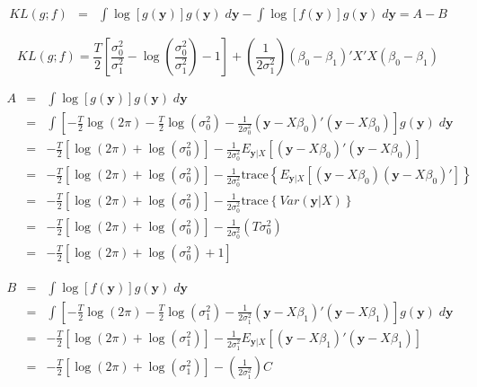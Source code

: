 \documentclass[12pt]{article}
\theoremstyle{definition}
\begin{document}
\begin{eqnarray*}
	KL(g;f)&=& \int \log[g(\mathbf{y})] g(\mathbf{y}) \; d \mathbf{y} - \int \log[f(\mathbf{y})]g(\mathbf{y}) \; d \mathbf{y} =  A - B 
\end{eqnarray*}

	$$KL(g;f) =  \frac{T}{2}\left[\frac{\sigma_0^2}{\sigma_1^2} - \log\left(\frac{\sigma_0^2}{\sigma_1^2}\right) - 1 \right] + \left(\frac{1}{2 \sigma_1^2}\right)\left(\beta_0 - \beta_1\right)'X'X\left(\beta_0 - \beta_1\right)$$

\begin{eqnarray*}
	A &=&\int \log[g(\mathbf{y})] g(\mathbf{y}) \; d \mathbf{y} \\
	&=& \int \left[-\frac{T}{2}\log(2\pi) -\frac{T}{2} \log(\sigma^2_0) - \frac{1}{2\sigma_0^2}\left(\textbf{y} - X\beta_0\right)'\left(\textbf{y} -X\beta_0\right) \right] g(\mathbf{y})\; d\mathbf{y}\\
	&=& -\frac{T}{2}\left[ \log(2\pi) + \log(\sigma^2_0)\right] -  \frac{1}{2\sigma_0^2} E_{\mathbf{y}|X}\left[\left(\textbf{y} - X\beta_0\right)'\left(\textbf{y} -X\beta_0\right)\right]\\
	&=& -\frac{T}{2}\left[ \log(2\pi) + \log(\sigma^2_0)\right] -  \frac{1}{2\sigma_0^2}\mbox{trace}\left\{ E_{\mathbf{y}|X}\left[\left(\textbf{y} - X\beta_0\right)\left(\textbf{y} -X\beta_0\right)'\right]\right\}\\
	&=& -\frac{T}{2}\left[ \log(2\pi) + \log(\sigma^2_0)\right] -  \frac{1}{2\sigma_0^2}\mbox{trace}\left\{ Var(\mathbf{y}|X)\right\}\\
	&=& -\frac{T}{2}\left[ \log(2\pi) + \log(\sigma^2_0)\right] -  \frac{1}{2\sigma_0^2}\left(T \sigma_0^2\right)\\
	&=& -\frac{T}{2}\left[ \log(2\pi) + \log(\sigma^2_0) +  1 \right]
\end{eqnarray*}


\begin{eqnarray*}
	B &=& \int \log[f(\mathbf{y})] g(\mathbf{y}) \; d \mathbf{y}\\
	&=& \int \left[ -\frac{T}{2}\log(2\pi) -\frac{T}{2} \log(\sigma^2_1) - \frac{1}{2\sigma_1^2}\left(\textbf{y} - X\beta_1\right)'\left(\textbf{y} -X\beta_1\right) \right] g(\mathbf{y})\;  d \mathbf{y}\\
		&=& -\frac{T}{2}\left[\log(2\pi) + \log(\sigma^2_1) \right]- \frac{1}{2\sigma_1^2}E_{\mathbf{y}|X}\left[\left(\textbf{y} - X\beta_1\right)'\left(\textbf{y} -X\beta_1\right)\right]\\
		&=&  -\frac{T}{2}\left[\log(2\pi) + \log(\sigma^2_1) \right] - \left(\frac{1}{2\sigma_1^2}\right)C
\end{eqnarray*}
\end{document}
